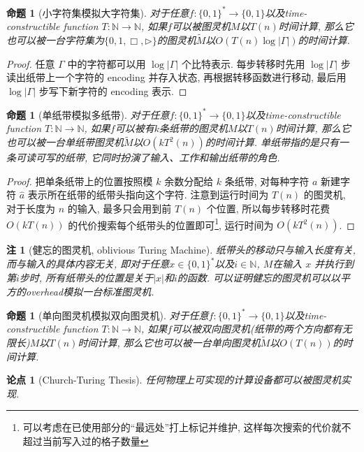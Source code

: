 \documentclass[8pt]{article}
\theoremstyle{compact}
\newtheorem{proposition}[theorem]{命题}
\newtheorem{remark}[theorem]{注}
\newtheorem{thesis}[theorem]{论点}
\begin{document}
\begin{proposition}[小字符集模拟大字符集]
	对于任意$f: \{0, 1\}^* \to \{0, 1\}$以及time-constructible function $T: \mathbb{N} \to \mathbb{N}$, 如果$f$可以被图灵机$M$以$T(n)$时间计算, 那么它也可以被一台字符集为$\{0, 1, \Box, \triangleright\}$的图灵机$\tilde{M}$以$O(T(n)\log |\Gamma|)$的时间计算. 
\end{proposition}
\begin{proof}
	任意 $\Gamma$ 中的字符都可以用 $\log |\Gamma|$ 个比特表示. 每步转移时先用 $\log |\Gamma|$ 步读出纸带上一个字符的 encoding 并存入状态, 再根据转移函数进行移动, 最后用 $\log |\Gamma|$ 步写下新字符的 encoding 表示.
\end{proof}
\begin{proposition}[单纸带模拟多纸带]
	对于任意$f: \{0, 1\}^* \to \{0, 1\}$以及time-constructible function $T: \mathbb{N} \to \mathbb{N}$, 如果$f$可以被有$k$条纸带的图灵机$M$以$T(n)$时间计算, 那么它也可以被一台单纸带图灵机$\tilde{M}$以$O(kT^2(n))$的时间计算. 单纸带指的是只有一条可读可写的纸带, 它同时扮演了输入、工作和输出纸带的角色. 
\end{proposition}
\begin{proof}
	把单条纸带上的位置按照模 $k$ 余数分配给 $k$ 条纸带, 对每种字符 $a$ 新建字符 $\hat a$ 表示所在纸带的纸带头指向这个字符. 注意到运行时间为 $T(n)$ 的图灵机, 对于长度为 $n$ 的输入, 最多只会用到前 $T(n)$ 个位置, 所以每步转移时花费 $O(kT(n))$ 的代价搜索每个纸带头的位置即可\footnote{可以考虑在已使用部分的“最远处”打上标记并维护, 这样每次搜索的代价就不超过当前写入过的格子数量}, 运行时间为 $O(kT^2(n))$.
\end{proof}
\begin{remark}[健忘的图灵机, oblivious Turing Machine]
	纸带头的移动只与输入长度有关, 而与输入的具体内容无关, 即对于任意$x \in \{0, 1\}^*$以及$i \in \mathbb N$, $M$在输入 $x$ 并执行到第$i$步时, 所有纸带头的位置是关于$|x|$和$i$的函数. 可以证明健忘的图灵机可以以平方的overhead模拟一台标准图灵机. 
	\label{oblivious}
\end{remark}
\begin{proposition}[单向图灵机模拟双向图灵机]
	对于任意$f: \{0, 1\}^* \to \{0, 1\}$以及time-constructible function $T: \mathbb{N} \to \mathbb{N}$, 如果$f$可以被双向图灵机(纸带的两个方向都有无限长)$M$以$T(n)$时间计算, 那么它也可以被一台单向图灵机$\tilde{M}$以$O(T(n))$的时间计算. 
\end{proposition}
\begin{thesis}[Church-Turing Thesis]
	任何物理上可实现的计算设备都可以被图灵机实现. 
\end{thesis}
\end{document}
